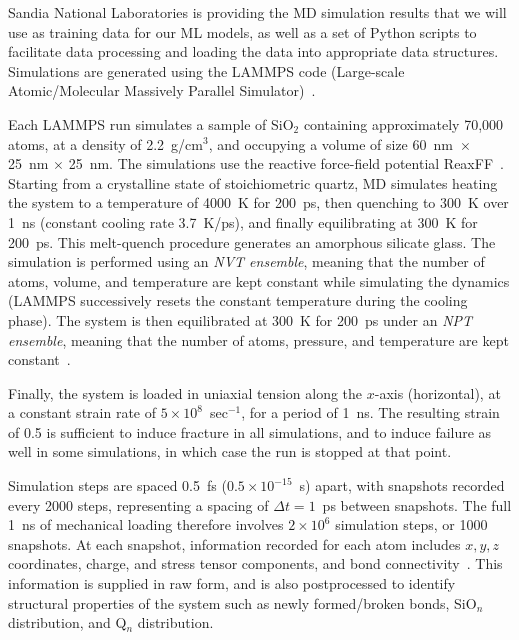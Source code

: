 
Sandia National Laboratories is providing the MD simulation results that we will use as training data for our ML models, as well as a set of Python scripts to facilitate data processing and loading the data into appropriate data structures. Simulations are generated using the LAMMPS code (Large-scale Atomic/Molecular Massively Parallel Simulator)~\cite{PAMD}.

Each LAMMPS run simulates a sample of SiO$_2$ containing approximately 70,000 atoms, at a density of 2.2~g/cm$^3$, and occupying a volume of size 60~nm~$\times$ 25~nm $\times$ 25~nm. The simulations use the reactive force-field potential ReaxFF~\cite{pitman2012dynamics}.  Starting from a crystalline state of stoichiometric quartz, MD simulates heating the system to a temperature of 4000~K for 200~ps, then quenching to 300~K over 1~ns (constant cooling rate 3.7~K/ps), and finally equilibrating at 300~K for 200~ps. This melt-quench procedure generates an amorphous silicate glass.  The simulation is performed using an \emph{NVT ensemble}, meaning that the number of atoms, volume, and temperature are kept constant while simulating the dynamics (LAMMPS successively resets the constant temperature during the cooling phase).  The system is then equilibrated at 300~K for 200~ps under an \emph{NPT ensemble}, meaning that the number of atoms, pressure, and temperature are kept constant~\cite{markpres}.

Finally, the system is loaded in uniaxial tension along the $x$-axis (horizontal), at a constant strain rate of $5\times 10^8$~sec$^{-1}$, for a period of 1~ns.  The resulting strain of 0.5 is sufficient to induce fracture in all simulations, and to induce failure as well in some simulations, in which case the run is stopped at that point.

Simulation steps are spaced 0.5~fs ($0.5 \times 10^{-15}$~s) apart, with snapshots recorded every 2000 steps, representing a spacing of $\Delta t = 1$~ps between snapshots.  The full 1~ns of mechanical loading therefore involves $2 \times 10^6$ simulation steps, or 1000 snapshots. At each snapshot, information recorded for each atom includes $x,y,z$ coordinates, charge, and stress tensor components, and bond connectivity~\cite{markpres}.  This information is supplied in raw form, and is also postprocessed to identify structural properties of the system such as newly formed/broken bonds, SiO$_n$ distribution, and Q$_n$ distribution.


